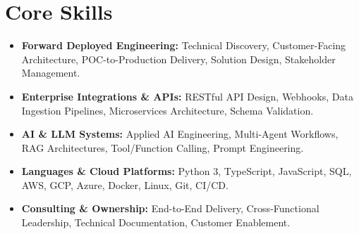 \documentclass[a4paper,10pt]{article}
\begin{document}
\section{Core Skills}
\begin{itemize}
  \item \textbf{Forward Deployed Engineering:} Technical Discovery, Customer-Facing Architecture, POC-to-Production Delivery, Solution Design, Stakeholder Management.
  \item \textbf{Enterprise Integrations \& APIs:} RESTful API Design, Webhooks, Data Ingestion Pipelines, Microservices Architecture, Schema Validation.
  \item \textbf{AI \& LLM Systems:} Applied AI Engineering, Multi-Agent Workflows, RAG Architectures, Tool/Function Calling, Prompt Engineering.
  \item \textbf{Languages \& Cloud Platforms:} Python 3, TypeScript, JavaScript, SQL, AWS, GCP, Azure, Docker, Linux, Git, CI/CD.
  \item \textbf{Consulting \& Ownership:} End-to-End Delivery, Cross-Functional Leadership, Technical Documentation, Customer Enablement.
\end{itemize}
\end{document}
